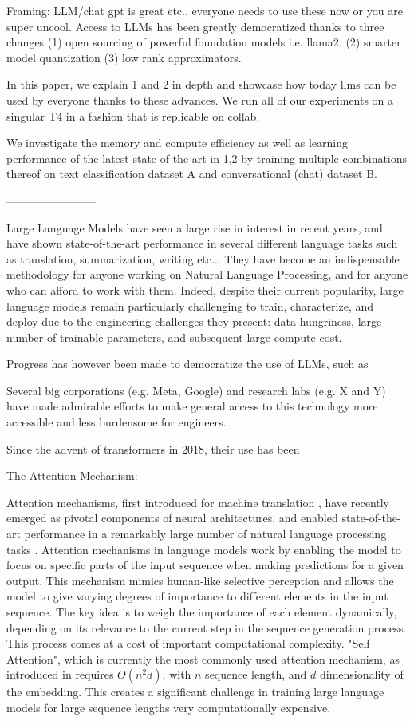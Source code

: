 Framing: LLM/chat gpt is great etc.. everyone needs to use these now or you are super uncool.
Access to LLMs has been greatly democratized thanks to three changes (1) open sourcing of powerful foundation models i.e. llama2. (2) smarter model quantization (3) low rank approximators.

In this paper, we explain 1 and 2 in depth and showcase how today llms can be used by everyone thanks to these advances. We run all of our experiments on a singular T4 in a fashion that is replicable on collab.

We investigate the memory and compute efficiency as well as learning performance of the latest state-of-the-art in 1,2 by training multiple combinations thereof on text classification dataset A and conversational (chat) dataset B. 

------------------------

Large Language Models have seen a large rise in interest in recent years, and have shown state-of-the-art performance in several different language tasks such as translation, summarization, writing etc... They have become an indispensable methodology for anyone working on Natural Language Processing, and for anyone who can afford to work with them. Indeed, despite their current popularity, large language models remain particularly challenging to train, characterize, and deploy due to the engineering challenges they present: data-hungriness, large number of trainable parameters, and subsequent large compute cost. 


Progress has however been made to democratize the use of LLMs, such as 

Several big corporations (e.g. Meta, Google) and research labs (e.g. X and Y) have made admirable efforts to make general access to this technology more accessible and less burdensome for engineers. 


Since the advent of transformers in 2018, their use has been 


The Attention Mechanism: 

Attention mechanisms, first introduced for machine translation \cite{bahdanau2014neural}, have recently emerged as pivotal components of neural architectures, and enabled state-of-the-art performance in a remarkably large number of natural language processing tasks \cite{attention_review}. Attention mechanisms in language models work by enabling the model to focus on specific parts of the input sequence when making predictions for a given output. This mechanism mimics human-like selective perception and allows the model to give varying degrees of importance to different elements in the input sequence. The key idea is to weigh the importance of each element dynamically, depending on its relevance to the current step in the sequence generation process. This process comes at a cost of important computational complexity. "Self Attention", which is currently the most commonly used attention mechanism, as introduced in \cite{vaswani_attention_2017} requires $O(n^2 d)$, with $n$ sequence length, and $d$ dimensionality of the embedding. This creates a significant challenge in training large language models for large sequence lengths very computationally expensive.  


